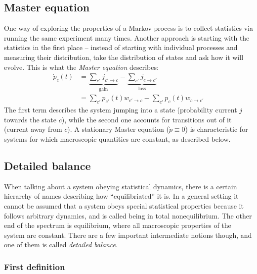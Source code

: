 \subsection{Master equation}
\label{sec:master equation}

One way of exploring the properties of a Markov process is to collect statistics via running the same experiment many times. Another approach is starting with the statistics in the first place -- instead of starting with individual processes and measuring their distribution, take the distribution of states and ask how it will evolve. This is what the \emph{Master equation} describes:
%
\begin{align}
	\label{eqn:master}
	\dot p_c(t)
		&= \underbrace{\sum_{c'} j_{c'\to c}}_{\text{gain}}
		- \underbrace{\sum_{c'} j_{c\to c'}}_{\text{loss}} \\
		&= \sum_{c'} p_{c'}(t)w_{c'\to c}
		- \sum_{c'} p_c(t)w_{c\to c'}
\end{align}
%
The first term describes the system jumping into a state (probability current \(j\) towards the state \(c\)), while the second one accounts for transitions out of it (current away from \(c\)). A stationary Master equation (\(\dot p \equiv 0\)) is characteristic for systems for which macroscopic quantities are constant, as described below.






\subsection{Detailed balance}
\label{sec:detailed balance}

When talking about a system obeying statistical dynamics, there is a certain hierarchy of names describing how ``equilibriated'' it is. In a general setting it cannot be assumed that a system obeys special statistical properties because it follows arbitrary dynamics, and is called being in total nonequilibrium. The other end of the spectrum is equilibrium, where all macroscopic properties of the system are constant. There are a few important intermediate notions though, and one of them is called \emph{detailed balance}.

\subsubsection{First definition}

